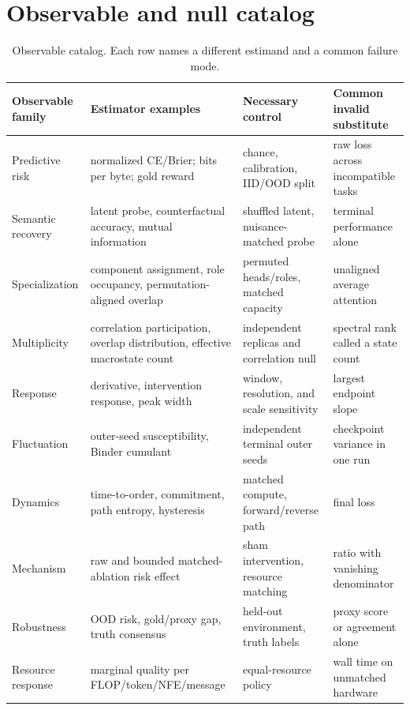 \section{Observable and null catalog}
\label{app:observables}

\begin{table}[tbp]
\centering\scriptsize
\begin{tabularx}{\linewidth}{@{}p{25mm}p{34mm}p{33mm}Y@{}}
\toprule
Observable family & Estimator examples & Necessary control & Common invalid
substitute \\
\midrule
Predictive risk & normalized CE/Brier; bits per byte; gold reward & chance,
calibration, IID/OOD split & raw loss across incompatible tasks \\
Semantic recovery & latent probe, counterfactual accuracy, mutual information &
shuffled latent, nuisance-matched probe & terminal performance alone \\
Specialization & component assignment, role occupancy, permutation-aligned
overlap & permuted heads/roles, matched capacity & unaligned average attention \\
Multiplicity & correlation participation, overlap distribution, effective
macrostate count & independent replicas and correlation null & spectral rank
called a state count \\
Response & derivative, intervention response, peak width & window, resolution,
and scale sensitivity & largest endpoint slope \\
Fluctuation & outer-seed susceptibility, Binder cumulant & independent terminal
outer seeds & checkpoint variance in one run \\
Dynamics & time-to-order, commitment, path entropy, hysteresis & matched compute,
forward/reverse path & final loss \\
Mechanism & raw and bounded matched-ablation risk effect & sham intervention,
resource matching & ratio with vanishing denominator \\
Robustness & OOD risk, gold/proxy gap, truth consensus & held-out environment,
truth labels & proxy score or agreement alone \\
Resource response & marginal quality per FLOP/token/NFE/message & equal-resource
policy & wall time on unmatched hardware \\
\bottomrule
\end{tabularx}
\caption{Observable catalog. Each row names a different estimand and a common
failure mode.}
\label{tab:observable-catalog}
\end{table}

